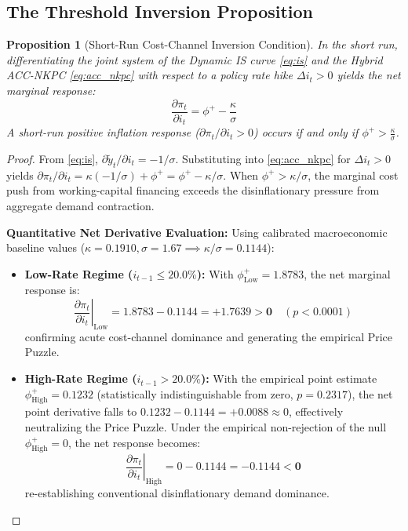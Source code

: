 \documentclass[review,12pt]{elsarticle}
\newtheorem{proposition}{Proposition}
\begin{document}
\subsection{The Threshold Inversion Proposition}

\begin{proposition}[Short-Run Cost-Channel Inversion Condition]
\label{prop:inversion}
In the short run, differentiating the joint system of the Dynamic IS curve \eqref{eq:is}
and the Hybrid ACC-NKPC \eqref{eq:acc_nkpc} with respect to a policy rate hike $\Delta i_t > 0$
yields the net marginal response:
\begin{equation}
\frac{\partial\pi_t}{\partial i_t} = \phi^{+} - \frac{\kappa}{\sigma}
\label{eq:inversion}
\end{equation}
A short-run positive inflation response ($\partial\pi_t/\partial i_t > 0$) occurs if and only if
$\phi^{+} > \frac{\kappa}{\sigma}$.
\end{proposition}
\begin{proof}
From \eqref{eq:is}, $\partial\tilde{y}_t/\partial i_t = -1/\sigma$. Substituting into
\eqref{eq:acc_nkpc} for $\Delta i_t > 0$ yields $\partial\pi_t/\partial i_t = \kappa(-1/\sigma) + \phi^+ = \phi^+ - \kappa/\sigma$.
When $\phi^+ > \kappa/\sigma$, the marginal cost push from working-capital financing exceeds the disinflationary pressure from aggregate demand contraction.

\textbf{Quantitative Net Derivative Evaluation:} Using calibrated macroeconomic baseline values ($\kappa = 0.1910, \sigma = 1.67 \implies \kappa/\sigma = 0.1144$):
\begin{itemize}
    \item \textbf{Low-Rate Regime ($i_{t-1} \le 20.0\%$):} With $\phi_{\text{Low}}^+ = 1.8783$, the net marginal response is:
    \[
    \left.\frac{\partial\pi_t}{\partial i_t}\right|_{\text{Low}} = 1.8783 - 0.1144 = \mathbf{+1.7639 > 0} \quad (p < 0.0001)
    \]
    confirming acute cost-channel dominance and generating the empirical Price Puzzle.
    \item \textbf{High-Rate Regime ($i_{t-1} > 20.0\%$):} With the empirical point estimate $\phi_{\text{High}}^+ = 0.1232$ (statistically indistinguishable from zero, $p = 0.2317$), the net point derivative falls to $0.1232 - 0.1144 = +0.0088 \approx 0$, effectively neutralizing the Price Puzzle. Under the empirical non-rejection of the null $\phi_{\text{High}}^+ = 0$, the net response becomes:
    \[
    \left.\frac{\partial\pi_t}{\partial i_t}\right|_{\text{High}} = 0 - 0.1144 = \mathbf{-0.1144 < 0}
    \]
    re-establishing conventional disinflationary demand dominance.
\end{itemize}
\end{proof}
\end{document}
